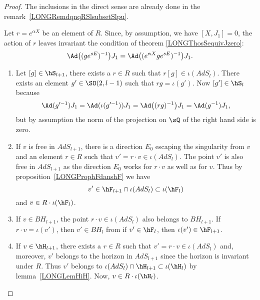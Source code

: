 \begin{proof}
    The inclusions in the direct sense are already done in the remark~\ref{LONGRemdqnqRSlsubsetSlpu}.

    Let $r= e^{\alpha X}$ be an element of $R$. Since, by assumption, we have $[X,J_1]=0$, the action of $r$ leaves invariant the condition of theorem \eqref{LONGThosSequivJzero}:
    \begin{equation}        \label{LONGEqalpharjnagitpas}
        \Ad\big( (g e^{sE})^{-1} \big)J_1=\Ad\big( ( e^{\alpha X}g e^{sE})^{-1} \big)J_1.
    \end{equation}
    \begin{enumerate}
        \item
            Let $[g]\in\hS_{l+1}$, there exists a $r\in R$ such that $r[g]\in \iota(AdS_l)$. There exists an element $g'\in \SO(2,l-1)$ such that $rg=\iota(g')$. Now $[g']\in\hS_l$ because
            \begin{equation}
                \Ad(g'^{-1})J_1=\Ad(\iota(g'^{-1}))J_1=\Ad\big(  (rg)^{-1} \big)J_1=\Ad(g^{-1})J_1,
            \end{equation}
            but by assumption the norm of the projection on $\sQ$ of the right hand side is zero.

        \item
            If $v$ is free in $AdS_{l+1}$, there is a direction $E_0$ escaping the singularity from $v$ and an element $r\in R$ such that $v'=r\cdot v\in\iota(AdS_l)$. The point $v'$ is also free in $AdS_{l+1}$ as the direction $E_0$ works for $r\cdot v$ as well as for $v$. Thus by proposition~\ref{LONGProphFdanshF} we have
            \begin{equation}
                v'\in\hF_{l+1}\cap\iota(AdS_l)\subset\iota(\hF_l)
            \end{equation}
            and $v\in R\cdot\iota(\hF_l)$.
        \item
            If $v\in BH_{l+1}$, the point $r\cdot v\in\iota(AdS_l)$ also belongs to $BH_{l+1}$. If $r\cdot v=\iota(v')$, then $v'\in BH_l$ from if $v'\in\hF_l$, then $\iota(v')\in\hF_{l+1}$.
        \item
            If $v\in\hH_{l+1}$, there exists a $r\in R$ such that $v'=r\cdot v\in\iota(AdS_l)$ and, moreover, $v'$ belongs to the horizon in $AdS_{l+1}$ since the horizon is invariant under $R$. Thus $v'$ belongs to $\iota(AdS_l)\cap\hH_{l+1}\subset \iota(\hH_l)$ by lemma~\ref{LONGLemHiH}.  Now, $v\in R\cdot\iota(\hH_l)$.

    \end{enumerate}
\end{proof}

